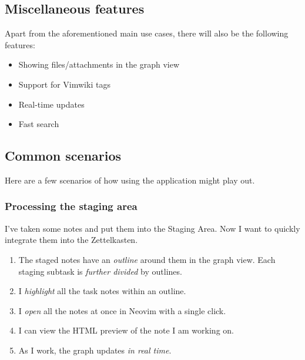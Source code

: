 \documentclass{article}
\begin{document}
\subsection{Miscellaneous features}

Apart from the aforementioned main use cases, there will also be the following features:

\begin{itemize}
	\item Showing files/attachments in the graph view

	\item Support for Vimwiki tags

	\item Real-time updates

	\item Fast search
\end{itemize}

\newpage

\subsection{Common scenarios} %

Here are a few scenarios of how using the application might play out.

\subsubsection{Processing the staging area}

I've taken some notes and put them into the Staging Area. Now I want to quickly integrate them into the Zettelkasten.

\begin{enumerate}
	\item The staged notes have an \emph{outline} around them in the graph view. Each staging subtask is \emph{further divided} by outlines.

	\item I \emph{highlight} all the task notes within an outline.

	\item I \emph{open} all the notes at once in Neovim with a single click.

	\item I can view the HTML preview of the note I am working on.

	\item As I work, the graph updates \emph{in real time}.
\end{enumerate}
\end{document}
